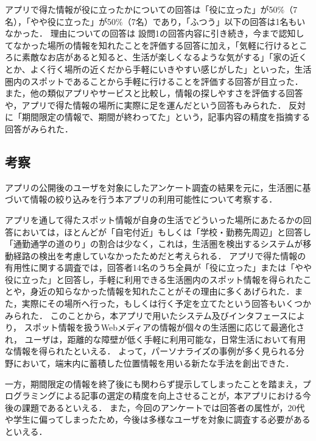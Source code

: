 \documentclass[a4paper]{jsarticle}
\begin{document}
\begin{enumerate}
\begin{enumerate}
\begin{enumerate}
  アプリで得た情報が役に立ったかについての回答は「役に立った」が50\%（7名），「やや役に立った」が50\%（7名）であり，「ふつう」以下の回答は1名もいなかった．
  理由についての回答は
  設問1の回答内容に引き続き，今まで認知してなかった場所の情報を知れたことを評価する回答に加え，「気軽に行けるところに素敵なお店があると知ると、生活が楽しくなるような気がする」「家の近くとか、よく行く場所の近くだから手軽にいきやすい感じがした」といった，生活圏内のスポットであることから手軽に行けることを評価する回答が目立った．
  また，他の類似アプリやサービスと比較し，情報の探しやすさを評価する回答や，アプリで得た情報の場所に実際に足を運んだという回答もみられた．
  反対に「期間限定の情報で、期間が終わってた」という，記事内容の精度を指摘する回答がみられた．



\end{enumerate}


\subsection{考察}
アプリの公開後のユーザを対象にしたアンケート調査の結果を元に，生活圏に基づいて情報の絞り込みを行う本アプリの利用可能性について考察する．

アプリを通して得たスポット情報が自身の生活でどういった場所にあたるかの回答においては，ほとんどが「自宅付近」もしくは「学校・勤務先周辺」と回答し「通勤通学の道のり」の割合は少なく，これは，生活圏を検出するシステムが移動経路の検出を考慮していなかったためだと考えられる．
アプリで得た情報の有用性に関する調査では，回答者14名のうち全員が「役に立った」または「やや役に立った」と回答し，手軽に利用できる生活圏内のスポット情報を得られたことや，身近の知らなかった情報を知れたことがその理由に多くあげられた．また，実際にその場所へ行った，もしくは行く予定を立てたという回答もいくつかみられた．
このことから，本アプリで用いたシステム及びインタフェースにより，
スポット情報を扱うWebメディアの情報が個々の生活圏に応じて最適化され，
ユーザは，距離的な障壁が低く手軽に利用可能な，日常生活において有用な情報を得られたといえる．
よって，パーソナライズの事例が多く見られる分野において，端末内に蓄積した位置情報を用いる新たな手法を創出できた．

一方，期間限定の情報を終了後にも関わらず提示してしまったことを踏まえ，プログラミングによる記事の選定の精度を向上させることが，本アプリにおける今後の課題であるといえる．
また，今回のアンケートでは回答者の属性が，20代や学生に偏ってしまったため，今後は多様なユーザを対象に調査する必要があるといえる．


\end{enumerate}
\end{enumerate}
\end{document}
